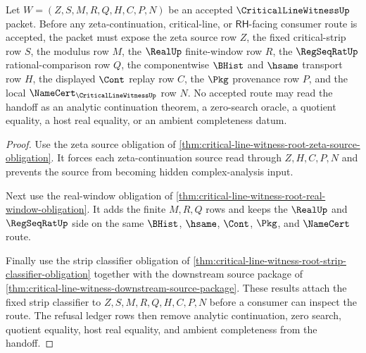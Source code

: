 \begin{theorem}
\label{thm:critical-line-witness-zeta-real-strip-root-handoff}
Let $W=(Z,S,M,R,Q,H,C,P,N)$ be an accepted $\CriticalLineWitnessUp$ packet. Before any zeta-continuation, critical-line, or $\mathsf{RH}$-facing consumer route is accepted, the packet must expose the zeta source row $Z$, the fixed critical-strip row $S$, the modulus row $M$, the $\RealUp$ finite-window row $R$, the $\RegSeqRatUp$ rational-comparison row $Q$, the componentwise $\BHist$ and $\hsame$ transport row $H$, the displayed $\Cont$ replay row $C$, the $\Pkg$ provenance row $P$, and the local $\NameCert_{\CriticalLineWitnessUp}$ row $N$. No accepted route may read the handoff as an analytic continuation theorem, a zero-search oracle, a quotient equality, a host real equality, or an ambient completeness datum.
\end{theorem}
\begin{proof}
Use the zeta source obligation of \autoref{thm:critical-line-witness-root-zeta-source-obligation}. It forces each zeta-continuation source read through $Z,H,C,P,N$ and prevents the source from becoming hidden complex-analysis input.

Next use the real-window obligation of \autoref{thm:critical-line-witness-root-real-window-obligation}. It adds the finite $M,R,Q$ rows and keeps the $\RealUp$ and $\RegSeqRatUp$ side on the same $\BHist$, $\hsame$, $\Cont$, $\Pkg$, and $\NameCert$ route.

Finally use the strip classifier obligation of \autoref{thm:critical-line-witness-root-strip-classifier-obligation} together with the downstream source package of \autoref{thm:critical-line-witness-downstream-source-package}. These results attach the fixed strip classifier to $Z,S,M,R,Q,H,C,P,N$ before a consumer can inspect the route. The refusal ledger rows then remove analytic continuation, zero search, quotient equality, host real equality, and ambient completeness from the handoff.
\end{proof}

